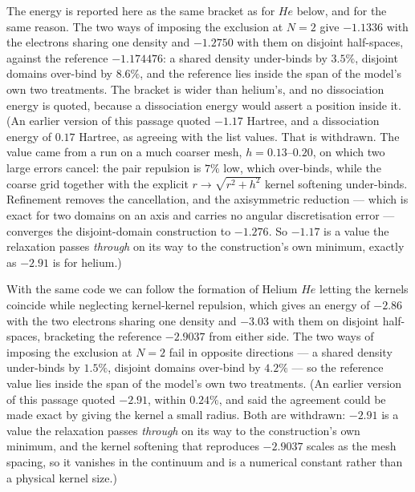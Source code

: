 \documentclass[11pt]{article} %
\begin{document}
The energy is reported here as the same bracket as for $He$ below, and for the same reason.  The two ways of imposing the exclusion at $N=2$ give $-1.1336$ with the electrons sharing one density and $-1.2750$ with them on disjoint half-spaces, against the reference $-1.174476$:  a shared density under-binds by $3.5\%$, disjoint domains over-bind by $8.6\%$, and the reference lies inside the span of the model's own two treatments.  The bracket is wider than helium's, and no dissociation energy is quoted, because a dissociation energy would assert a position inside it.  (An earlier version of this passage quoted $-1.17$ Hartree, and a dissociation energy of $0.17$ Hartree, as agreeing with the list values.  That is withdrawn.  The value came from a run on a much coarser mesh, $h=0.13$--$0.20$, on which two large errors cancel:  the pair repulsion is $7\%$ low, which over-binds, while the coarse grid together with the explicit $r\to\sqrt{r^2+h^2}$ kernel softening under-binds.  Refinement removes the cancellation, and the axisymmetric reduction --- which is exact for two domains on an axis and carries no angular discretisation error --- converges the disjoint-domain construction to $-1.276$.  So $-1.17$ is a value the relaxation passes \emph{through} on its way to the construction's own minimum, exactly as $-2.91$ is for helium.)

With the same code we can follow the formation of Helium $He$ letting the kernels coincide while neglecting kernel-kernel repulsion,  which gives an energy of $-2.86$ with the two electrons sharing one density and $-3.03$ with them on disjoint half-spaces, bracketing the reference $-2.9037$ from either side.  The two ways of imposing the exclusion at $N=2$ fail in opposite directions --- a shared density under-binds by $1.5\%$, disjoint domains over-bind by $4.2\%$ --- so the reference value lies inside the span of the model's own two treatments.  (An earlier version of this passage quoted $-2.91$, within $0.24\%$, and said the agreement could be made exact by giving the kernel a small radius.  Both are withdrawn: $-2.91$ is a value the relaxation passes \emph{through} on its way to the construction's own minimum, and the kernel softening that reproduces $-2.9037$ scales as the mesh spacing, so it vanishes in the continuum and is a numerical constant rather than a physical kernel size.) 
\end{document}
